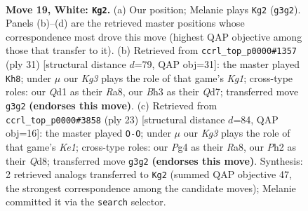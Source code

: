 \documentclass[11pt]{article}
\begin{document}
\clearpage

\begin{figure}[p]\centering
\begin{subfigure}{0.46\textwidth}\centering
\resizebox{\linewidth}{!}{%
\newchessgame
\chessboard[
  setfen={rbbqr1k1/pp3ppp/1P2p1n1/8/3p2P1/1P4KB/P2P1P1P/RNBQR3 w - - 1 19},
  showmover=false,
  pgfstyle=straightmove, color=movearrow, markmove={g3-g2}
]}
\caption{}
\end{subfigure}\hfill
\begin{subfigure}{0.46\textwidth}\centering
\resizebox{\linewidth}{!}{%
\newchessgame
\chessboard[
  setfen={r4rk1/1p1q2pp/1bn1p3/p2p4/1P2pP2/1QP1P3/P3B1PP/R1B2R1K b - - 1 16},
  showmover=false,
  pgfstyle=straightmove, color=movearrow, markmove={g8-h8}
]}
\caption{}
\end{subfigure}
\\[4pt]
\begin{subfigure}{0.46\textwidth}\centering
\resizebox{\linewidth}{!}{%
\newchessgame
\chessboard[
  setfen={r1bqk2r/2pp1ppp/2p3n1/p3b3/1P2P3/2PB1N2/P1Q2PPP/R1B2RK1 b kq - 3 12},
  showmover=false,
  pgfstyle=straightmove, color=movearrow, markmove={e8-g8}
]}
\caption{}
\end{subfigure}\hfill

\caption{\textbf{Move 19, White: \texttt{Kg2}.} (a) Our position; Melanie plays \texttt{Kg2} (\texttt{g3g2}). Panels (b)--(d) are the retrieved master positions whose correspondence most drove this move (highest QAP objective among those that transfer to it). (b) Retrieved from \texttt{ccrl\_top\_p0000\#1357} (ply 31) [structural distance $d$=79, QAP obj=31]: the master played \texttt{Kh8}; under $\mu$ our \emph{Kg3} plays the role of that game's \emph{Kg1}; cross-type roles: our \emph{Q}d1 as their \emph{R}a8, our \emph{B}h3 as their \emph{Q}d7; transferred move \texttt{g3g2} \textbf{(endorses this move)}. (c) Retrieved from \texttt{ccrl\_top\_p0000\#3858} (ply 23) [structural distance $d$=84, QAP obj=16]: the master played \texttt{O-O}; under $\mu$ our \emph{Kg3} plays the role of that game's \emph{Ke1}; cross-type roles: our \emph{P}g4 as their \emph{R}a8, our \emph{P}h2 as their \emph{Q}d8; transferred move \texttt{g3g2} \textbf{(endorses this move)}. Synthesis: 2 retrieved analogs transferred to \texttt{Kg2} (summed QAP objective 47, the strongest correspondence among the candidate moves); Melanie committed it via the \texttt{search} selector.}
\label{fig:thought-m36}
\end{figure}
\end{document}
